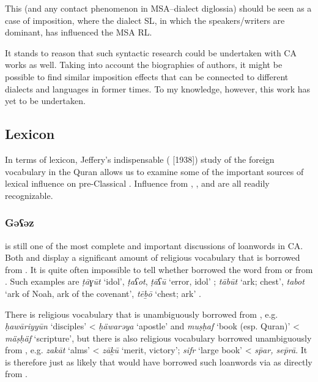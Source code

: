 \documentclass[output=paper]{langsci/langscibook}
\begin{document}
This (and any contact phenomenon in MSA–dialect {diglossia}) should be seen as a case of {imposition}, where the dialect {SL}, in which the speakers/writers are dominant, has influenced the MSA {RL}. 

It stands to reason that such syntactic research could be undertaken with CA works as well. Taking into account the biographies of authors, it might be possible to find similar {imposition} effects that can be connected to different dialects and languages in former times. To my knowledge, however, this work has yet to be undertaken.

\subsection{Lexicon}

In terms of lexicon, Jeffery’s indispensable (\citeyear{Jeffrey2007} [1938]) study of the foreign vocabulary in the {Quran} allows us to examine some of the important sources of lexical influence on pre-Classical . Influence from , ,  and  are all readily recognizable. 

\subsubsection{\label{bkm:Ref13224677}Gəʕəz}

\citet{Nöldeke1910} is still one of the most complete and important discussions of  {loanwords} in CA. Both  and  display a significant amount of religious vocabulary that is borrowed from . It is quite often impossible to tell whether  borrowed the word from  or from . Such examples are \textit{ṭāɣūt} ‘idol’,  \textit{ṭaʕot},  \textit{ṭāʕū} ‘error, idol’ \citep[48]{Nöldeke1910}; \textit{tābūt} ‘ark; chest’,  \textit{tabot} ‘ark of Noah, ark of the covenant’,  \textit{tēḇō} ‘chest; ark’ \citep[49]{Nöldeke1910}.

There is religious vocabulary that is unambiguously borrowed from , e.g. \textit{ḥawāriyyūn} ‘disciples’ <  \textit{ḥäwarəya} ‘apostle’ and \textit{muṣḥaf} ‘book (esp. {Quran})’ <  \textit{mäṣḥäf} ‘scripture’, but there is also religious vocabulary borrowed unambiguously from , e.g. \textit{zakāt} ‘alms’ <  \textit{zāḵū} ‘merit, victory’; \textit{sifr} ‘large book’ <  \textit{sp̄ar, sep̄rā}. It is therefore just as likely that  would have borrowed such  {loanwords} via  as directly from .
\end{document}
